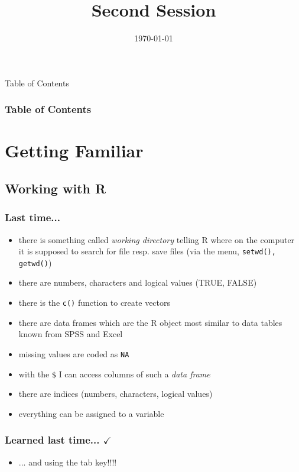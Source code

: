 \documentclass[xcolor={table},c]{beamer}
\begin{document}
\title{Second Session}   
\date{\today}


\begin{frame}
\titlepage
\end{frame}

\begin{frame}{Table of Contents}
\frametitle{Table of Contents}\tableofcontents
\end{frame}

\section{Getting Familiar}
\subsection{Working with R}
\begin{frame}\frametitle{Last time... }
  \begin{itemize}
    \item there is something called \textit{working directory} telling R where on the computer it is supposed to search for file resp. save files (via the menu, \texttt{setwd(), getwd()})
    \item there are numbers, characters and logical values (TRUE, FALSE)
    \item there is the \texttt{c()} function to create vectors
    \item there are data frames which are the R object most similar to data tables known from SPSS and Excel
    \item missing values are coded as \texttt{NA}
    \item with the \texttt{\$} I can access columns of such a \textit{data frame} 
    \item there are indices (numbers, characters, logical values)
    \item everything can be assigned to a variable
  \end{itemize}
\end{frame}

\begin{frame}\frametitle{Learned last time... $\checkmark$}
  \begin{itemize}
    \item ... and using the tab key!!!!
   \end{itemize}
\end{frame}
\end{document}
